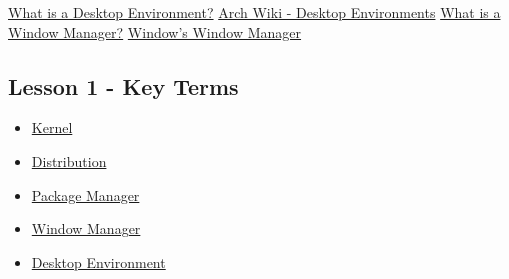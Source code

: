 \documentclass[11pt]{article}
\begin{document}
\href{https://itsfoss.com/what-is-desktop-environment/}{What is a Desktop Environment?}
\href{https://wiki.archlinux.org/title/Desktop\_environment}{Arch Wiki - Desktop Environments}
\href{https://www.techopedia.com/definition/10043/window-manager}{What is a Window Manager?}
\href{https://www.howtogeek.com/1119/what-is-dwmexe-and-why-is-it-running/}{Window's Window Manager}

\subsection{Lesson 1 - Key Terms}
\label{sec:org5beaa20}
\begin{itemize}
\item \hyperref[sec:org5649b0a]{Kernel}
\item \hyperref[sec:org615b51f]{Distribution}
\item \hyperref[sec:org6ef867c]{Package Manager}
\item \hyperref[sec:org9fbb467]{Window Manager}
\item \hyperref[sec:org9fbb467]{Desktop Environment}
\end{itemize}
\end{document}
